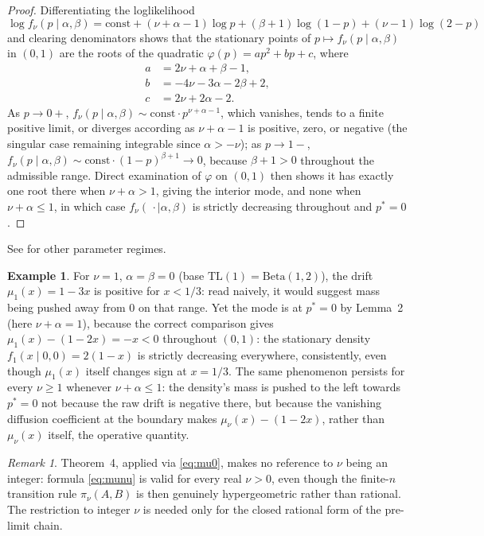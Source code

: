 \documentclass[11pt,reqno]{amsart}
\theoremstyle{definition}
\newtheorem{example}[theorem]{Example}
\theoremstyle{remark}
\newtheorem{remark}[theorem]{Remark}
\numberwithin{equation}{section}
\begin{document}
\begin{proof}
Differentiating the loglikelihood
\[
\log f_\nu(p\mid\alpha,\beta)=\mathrm{const}+(\nu+\alpha-1)\log p+(\beta+1)\log(1-p)+(\nu-1)\log(2-p)
\]
and clearing denominators shows that the stationary points of \(p\mapsto f_\nu(p\mid\alpha,\beta)\) in \((0,1)\) are the roots of the quadratic \(\varphi(p)=ap^2+bp+c\), where
\begin{align*}
a&=2\nu+\alpha+\beta-1,\\
b&=-4\nu-3\alpha-2\beta+2,\\
c&=2\nu+2\alpha-2.
\end{align*}
As \(p\to0+\), \(f_\nu(p\mid\alpha,\beta)\sim\mathrm{const}\cdot p^{\nu+\alpha-1}\), which vanishes, tends to a finite positive limit, or diverges according as \(\nu+\alpha-1\) is positive, zero, or negative (the singular case remaining integrable since \(\alpha>-\nu\)); as \(p\to1-\), \(f_\nu(p\mid\alpha,\beta)\sim\mathrm{const}\cdot(1-p)^{\beta+1}\to0\), because \(\beta+1>0\) throughout the admissible range. Direct examination of \(\varphi\) on \((0,1)\) then shows it has exactly one root there when \(\nu+\alpha>1\), giving the interior mode, and none when \(\nu+\alpha\le1\), in which case \(f_\nu(\,\cdot\mid\alpha,\beta)\) is strictly decreasing throughout and \(p^*=0\).
\end{proof}

See \cite{KotzVandorp2004} for other parameter regimes.

\begin{example}
For \(\nu=1\), \(\alpha=\beta=0\) (base \(\mathrm{TL}(1)=\mathrm{Beta}(1,2)\)), the drift \(\mu_1(x)=1-3x\) is positive for \(x<1/3\): read naively, it would suggest mass being pushed away from \(0\) on that range. Yet the mode is at \(p^*=0\) by Lemma~2 (here \(\nu+\alpha=1\)), because the correct comparison gives \(\mu_1(x)-(1-2x)=-x<0\) throughout \((0,1)\): the stationary density \(f_1(x\mid0,0)=2(1-x)\) is strictly decreasing everywhere, consistently, even though \(\mu_1(x)\) itself changes sign at \(x=1/3\). The same phenomenon persists for every \(\nu\ge1\) whenever \(\nu+\alpha\le1\): the density's mass is pushed to the left towards \(p^*=0\) not because the raw drift is negative there, but because the vanishing diffusion coefficient at the boundary makes \(\mu_\nu(x)-(1-2x)\), rather than \(\mu_\nu(x)\) itself, the operative quantity.
\end{example}

\begin{remark}
Theorem~4, applied via \eqref{eq:mu0}, makes no reference to \(\nu\) being an integer: formula \eqref{eq:munu} is valid for every real \(\nu>0\), even though the finite-\(n\) transition rule \(\pi_\nu(A,B)\) is then genuinely hypergeometric rather than rational. The restriction to integer \(\nu\) is needed only for the closed rational form of the pre-limit chain.
\end{remark}
\end{document}
